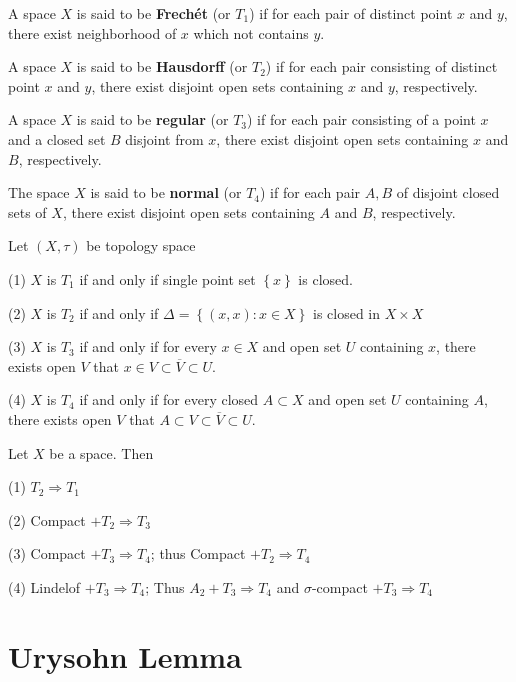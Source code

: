 \documentclass[12pt, a4paper, oneside]{book}
\begin{document}
\begin{definition}
    A space $X$ is said to be \textbf{Frechét} (or $T_1$) if for each pair of distinct point $x$ and
    $y$, there exist neighborhood of $x$ which not contains $y$.

    A space $X$ is said to be \textbf{Hausdorff} (or $T_2$) if for each pair consisting of distinct point $x$ and $y$, there exist disjoint open sets containing $x$ and $y$, respectively.


    A space $X$ is said to be \textbf{regular} (or $T_3$) if for each pair consisting of a point $x$ and a closed set $B$ disjoint from $x$, there exist disjoint open sets containing $x$ and $B$, respectively.

    The space $X$ is said to be \textbf{normal} (or $T_4$) if for each pair $A, B$ of disjoint closed sets of $X$, there exist disjoint open sets containing $A$ and $B$, respectively.
\end{definition}


\begin{theorem}
    Let $\left(X,\tau\right)$ be topology space

    (1) $X$ is $T_1$ if and only if single point set $\left\{x\right\}$ is closed.

    (2) $X$ is $T_2$ if and only if $\Delta=\left\{\left(x,x\right): x\in X\right\}$ is closed in $X\times X$

    (3) $X$ is $T_3$ if and only if for every $x\in X$ and open set $U$ containing $x$, there exists open $V$ that $x \in V \subset \overline{V} \subset U$.

    (4) $X$ is $T_4$ if and only if for every closed  $A\subset X$ and open set $U$ containing $A$, there exists open $V$ that $A \subset V \subset \overline{V} \subset U$.
\end{theorem}


\begin{proposition}
    Let $X$ be a space. Then

    (1) $T_2 \Rightarrow T_1$

    (2) Compact $+T_2 \Rightarrow T_3$

    (3) Compact $+T_3 \Rightarrow T_4$; thus Compact $+T_2 \Rightarrow T_4$

    (4) Lindelof $+T_3 \Rightarrow T_4$; Thus $A_2 + T_3 \Rightarrow T_4$ and $\sigma$-compact $+T_3 \Rightarrow T_4$
\end{proposition}


\section{Urysohn Lemma}  %
\end{document}
